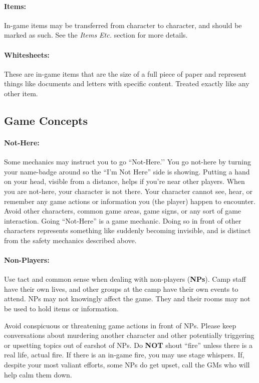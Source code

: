 \documentclass[sheet]{GL2020}
\begin{document}
\paragraph{Items:} In-game items may be transferred from character to character, and should be marked as such.  See the \emph{Items Etc.} section for more details.

\paragraph{Whitesheets:} These are in-game items that are the size of a full piece of paper and represent things like documents and letters with specific content. Treated exactly like any other item.

\subsection{Game Concepts}

\paragraph{Not-Here:} Some mechanics may instruct you to go ``Not-Here.'’ You go not-here by turning your name-badge around so the ``I'm Not Here'' side is showing. Putting a hand on your head, visible from a distance, helps if you're near other players. When you are not-here, your character is not there.  Your character cannot see, hear, or remember any game actions or information you (the player) happen to encounter.  Avoid other characters, common game areas, game signs, or any sort of game interaction. Going ``Not-Here'' is a game mechanic. Doing so in front of other characters represents something like suddenly becoming invisible, and is distinct from the safety mechanics described above.

\paragraph{Non-Players:} Use tact and common sense when dealing with non-players ({\bf NPs}). Camp staff have their own lives, and other groups at the camp have their own events to attend. NPs may not knowingly affect the game. They and their rooms may not be used to hold items or information.

Avoid conspicuous or threatening game actions in front of NPs. Please keep conversations about murdering another character and other potentially triggering or upsetting topics out of earshot of NPs. Do \textbf{NOT} shout ``fire'' unless there is a real life, actual fire. If there is an in-game fire, you may use stage whispers. If, despite your most valiant efforts, some NPs do get upset, call the GMs who will help calm them down.
\end{document}
